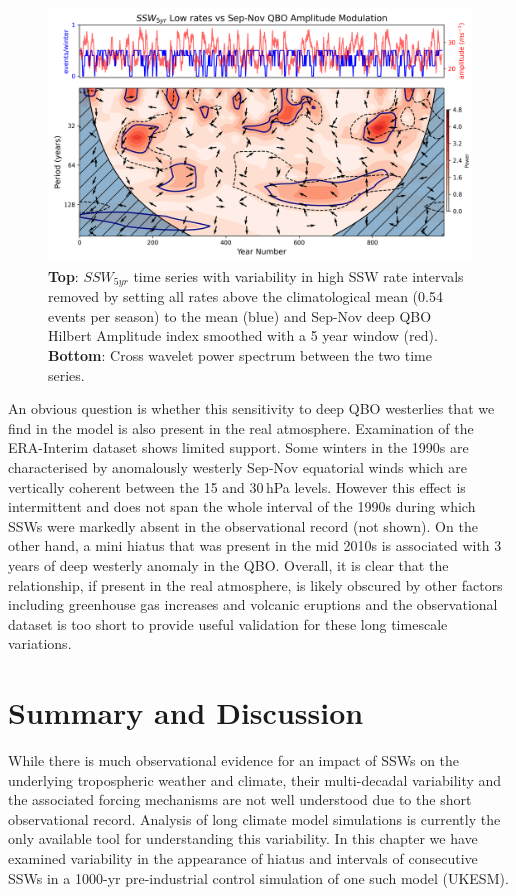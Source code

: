 \begin{figure}[h!]
\begin{center}
\includegraphics[width = 0.8\linewidth]{Figures/Figures-background/cross_power_SSWs_lowrate_vs_QBO_amplitude_modulation_5yr_mean.png}
\caption[cross power spectrum between deep QBO amplitude and SSW$_{5yr}$ with variations in high SSW rates removed]{\textbf{Top}: $SSW_{5yr}$ time series with variability in high SSW rate intervals removed by setting all rates above the climatological mean (0.54 events per season) to the mean (blue) and Sep-Nov deep QBO Hilbert Amplitude index smoothed with a 5 year window (red). \textbf{Bottom}: Cross wavelet power spectrum between the two time series.}
\label{fig:SSW_low_rate_QBO}
\end{center}
\end{figure}

An obvious question is whether this sensitivity to deep QBO westerlies that we find in the model is also present in the real atmosphere. Examination of the ERA-Interim dataset shows limited support. Some winters in the 1990s are characterised by anomalously westerly Sep-Nov equatorial winds which are vertically coherent between the 15 and 30\,hPa levels. However this effect is intermittent and does not span the whole interval of the 1990s during which SSWs were markedly absent in the observational record (not shown). On the other hand, a mini hiatus that was present in the mid 2010s is associated with 3 years of deep westerly anomaly in the QBO. Overall, it is clear that the relationship, if present in the real atmosphere, is likely obscured by other factors including greenhouse gas increases and volcanic eruptions and the observational dataset is too short to provide useful validation for these long timescale variations.  

\section{Summary and Discussion}
While there is much observational evidence for an impact of SSWs on the underlying tropospheric weather and climate, their multi-decadal variability and the associated forcing mechanisms are not well understood due to the short observational record. Analysis of long climate model simulations is currently the only available tool for understanding this variability. In this chapter we have examined variability in the appearance of hiatus and intervals of consecutive SSWs in a 1000-yr pre-industrial control simulation of one such model (UKESM).

